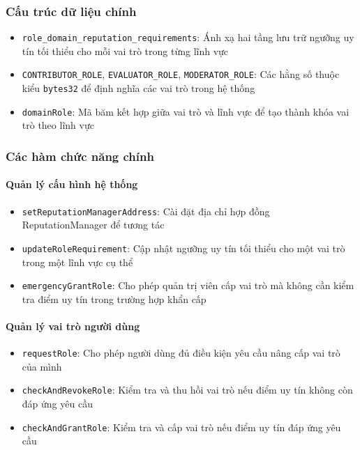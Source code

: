\subsubsection{Cấu trúc dữ liệu chính}

\begin{itemize}
  \item \texttt{role\_domain\_reputation\_requirements}: Ánh xạ hai tầng lưu trữ ngưỡng uy tín tối thiểu cho mỗi vai trò trong từng lĩnh vực
  \item \texttt{CONTRIBUTOR\_ROLE}, \texttt{EVALUATOR\_ROLE}, \texttt{MODERATOR\_ROLE}: Các hằng số thuộc kiểu \texttt{bytes32} để định nghĩa các vai trò trong hệ thống
  \item \texttt{domainRole}: Mã băm kết hợp giữa vai trò và lĩnh vực để tạo thành khóa vai trò theo lĩnh vực
\end{itemize}

\subsubsection{Các hàm chức năng chính}

\paragraph{Quản lý cấu hình hệ thống}

\begin{itemize}
  \item \texttt{setReputationManagerAddress}: Cài đặt địa chỉ hợp đồng ReputationManager để tương tác
  \item \texttt{updateRoleRequirement}: Cập nhật ngưỡng uy tín tối thiểu cho một vai trò trong một lĩnh vực cụ thể
  \item \texttt{emergencyGrantRole}: Cho phép quản trị viên cấp vai trò mà không cần kiểm tra điểm uy tín trong trường hợp khẩn cấp
\end{itemize}

\paragraph{Quản lý vai trò người dùng}

\begin{itemize}
  \item \texttt{requestRole}: Cho phép người dùng đủ điều kiện yêu cầu nâng cấp vai trò của mình
  \item \texttt{checkAndRevokeRole}: Kiểm tra và thu hồi vai trò nếu điểm uy tín không còn đáp ứng yêu cầu
  \item \texttt{checkAndGrantRole}: Kiểm tra và cấp vai trò nếu điểm uy tín đáp ứng yêu cầu
\end{itemize}

